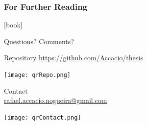 \documentclass[handout,aspectratio=169]{beamer}
\begin{document}
\begin{frame}[allowframebreaks]
% 
% 
  \frametitle<presentation>{For Further Reading}




[book]
\printbibliography[type=book,title={Books}]
\printbibliography[type=thesis,title={Books}]

\end{frame}

\appendix

\begin{frame}[plain]
  \centering
  \vfill
  Questions? Comments?
  \vfill
  \begin{minipage}[t]{.45\linewidth}
    \small
    \centering
    Repository
    \href{https://github.com/Accacio/thesis}{https://github.com/Accacio/thesis}

    \texttt{[image: qrRepo.png]}
  \end{minipage}
  \hfill
  \begin{minipage}[t]{.5\linewidth}
    \small
    \centering
    Contact\\
    \href{mailto:rafael.accacio.nogueira@gmail.com?subject=Seminar Lyon 2023}{rafael.accacio.nogueira@gmail.com}

    \texttt{[image: qrContact.png]}
  \end{minipage}
  \fi

\end{frame}
\end{document}
